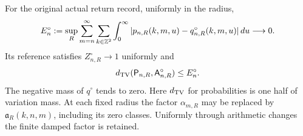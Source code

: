 \begin{theorem}
\label{thm:v58-canonical-raw}
For the original actual return record, uniformly in the radius,
\begin{equation}\label{eq:v58-canonical-L1}
 E_n^\circ:=\sup_R\sum_{m=n}^\infty\sum_{k\in\Z^2}
     \int_0^\infty|p_{n,R}(k,m,u)-q^\circ_{n,R}(k,m,u)|\,du
                                      \longrightarrow0.
\end{equation}
Its reference satisfies $Z^\circ_{n,R}\to1$ uniformly and
\[
 d_{\rm TV}(\mathsf P_{n,R},\mathsf A^\circ_{n,R})\le E_n^\circ.
\]
The negative mass of $q^\circ$ tends to zero. Here $d_{\rm TV}$ for
probabilities is one half of variation mass.
At each fixed radius the factor $\alpha_{m,R}$ may be replaced by
$\mathfrak a_R(k,n,m)$, including its zero classes. Uniformly through
arithmetic changes the finite damped factor is retained.
\end{theorem}
